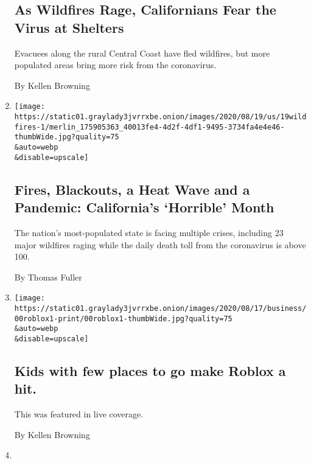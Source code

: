 \begin{enumerate}
{  \subsection{As Wildfires Rage, Californians Fear the Virus at
  Shelters}\label{as-wildfires-rage-californians-fear-the-virus-at-shelters}}

  Evacuees along the rural Central Coast have fled wildfires, but more
  populated areas bring more risk from the coronavirus.

  By Kellen Browning
\item
  \href{/2020/08/19/us/california-heatwave-blackouts-wildfires.html}{}

  \texttt{[image: https://static01.graylady3jvrrxbe.onion/images/2020/08/19/us/19wildfires-1/merlin\_175905363\_40013fe4-4d2f-4df1-9495-3734fa4e4e46-thumbWide.jpg?quality=75\\\&auto=webp\\\&disable=upscale]}

  \hypertarget{fires-blackouts-a-heat-wave-and-a-pandemic-californias-horrible-month}{%
  \subsection{Fires, Blackouts, a Heat Wave and a Pandemic: California's
  `Horrible'
  Month}\label{fires-blackouts-a-heat-wave-and-a-pandemic-californias-horrible-month}}

  The nation's most-populated state is facing multiple crises, including
  23 major wildfires raging while the daily death toll from the
  coronavirus is above 100.

  By Thomas Fuller
\item
  \href{/live/2020/08/17/business/stock-market-today-coronavirus/kids-with-few-places-to-go-make-roblox-a-hit}{}

  \texttt{[image: https://static01.graylady3jvrrxbe.onion/images/2020/08/17/business/00roblox1-print/00roblox1-thumbWide.jpg?quality=75\\\&auto=webp\\\&disable=upscale]}

  \hypertarget{kids-with-few-places-to-go-make-roblox-a-hit}{%
  \subsection{Kids with few places to go make Roblox a
  hit.}\label{kids-with-few-places-to-go-make-roblox-a-hit}}

  This was featured in live coverage.

  By Kellen Browning
\item
  \href{/2020/08/16/technology/roblox-tweens-videogame-coronavirus.html}{}


\end{enumerate}
